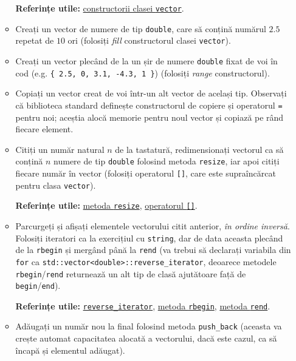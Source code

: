 \begin{enumerate}
\begin{itemize}
        \textbf{Referințe utile:} \href{https://cplusplus.com/reference/vector/vector/vector/}{constructorii clasei \texttt{vector}}.

        \item Creați un vector de numere de tip \texttt{double}, care să conțină numărul \(2.5\) repetat de \(10\) ori (folosiți \emph{fill} constructorul clasei \texttt{vector}).

        \item Creați un vector plecând de la un șir de numere \texttt{double} fixat de voi în cod (e.g. \texttt{\{ 2.5, 0, 3.1, -4.3, 1 \}}) (folosiți \emph{range} constructorul).

        \item Copiați un vector creat de voi într-un alt vector de același tip. Observați că biblioteca standard definește constructorul de copiere și operatorul \texttt{=} pentru noi; aceștia alocă memorie pentru noul vector și copiază pe rând fiecare element.

        \item Citiți un număr natural \(n\) de la tastatură, redimensionați vectorul ca să conțină \(n\) numere de tip \texttt{double} folosind metoda \texttt{resize}, iar apoi citiți fiecare număr în vector (folosiți operatorul \texttt{[]}, care este supraîncărcat pentru clasa \texttt{vector}).

        \textbf{Referințe utile:} \href{https://cplusplus.com/reference/vector/vector/resize/}{metoda \texttt{resize}}, \href{https://cplusplus.com/reference/vector/vector/operator[]/}{operatorul \texttt{[]}}.

        \item Parcurgeți și afișați elementele vectorului citit anterior, \emph{în ordine inversă}. Folosiți iteratori ca la exercițiul cu \texttt{string}, dar de data aceasta plecând de la \texttt{rbegin} și mergând până la \texttt{rend} (va trebui să declarați variabila din \texttt{for} ca \texttt{std::vector<double>::reverse\_iterator}, deoarece metodele \texttt{rbegin}/\texttt{rend} returnează un alt tip de clasă ajutătoare față de \texttt{begin}/\texttt{end}).

        \textbf{Referințe utile:} \href{https://cplusplus.com/reference/iterator/reverse_iterator/}{\texttt{reverse\_iterator}}, \href{https://cplusplus.com/reference/vector/vector/rbegin/}{metoda \texttt{rbegin}}, \href{https://cplusplus.com/reference/vector/vector/rend/}{metoda \texttt{rend}}.

        \item Adăugați un număr nou la final folosind metoda \texttt{push\_back} (aceasta va crește automat capacitatea alocată a vectorului, dacă este cazul, ca să încapă și elementul adăugat).


\end{itemize}
\end{enumerate}

